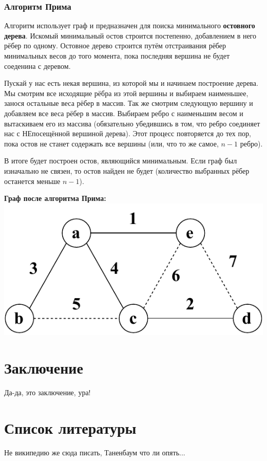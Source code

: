 \documentclass[utf8,14pt,a4paper,oneside,russian]{book}
\begin{document}
	\subsubsection{Алгоритм Прима}
	
	Алгоритм использует граф и предназначен для поиска минимального \textbf{остовного дерева}. Искомый минимальный остов строится постепенно, добавлением в него рёбер по одному. Остовное дерево строится путём отстраивания рёбер минимальных весов до того момента, пока последняя вершина не будет соеденина с деревом. 
	
	Пускай у нас есть некая вершина, из которой мы и начинаем построение дерева. Мы смотрим все исходящие рёбра из этой вершины и выбираем наименьшее, занося остальные веса рёбер в массив. Так же смотрим следующую вершину и добавляем все веса рёбер в массив. Выбираем ребро с наименьшим весом и вытаскиваем его из массива (обязательно убедившись в том, что ребро соединяет нас с НЕпосещённой вершиной дерева). Этот процесс повторяется до тех пор, пока остов не станет содержать все вершины (или, что то же самое, $n-1$ ребро).
	
	В итоге будет построен остов, являющийся минимальным. Если граф был изначально не связен, то остов найден не будет (количество выбранных рёбер останется меньше $n-1$).
	
	\begin{center}
		\textbf{Граф после алгоритма Прима:}\\
		\includegraphics[scale=0.8]{prima}\\
	\end{center}

	\newpage
	\section{Заключение}
	
	Да-да, это заключение, ура!

	\newpage
	\section{Список литературы}
	
	Не википедию же сюда писать, Таненбаум что ли опять...
	
\end{document}
